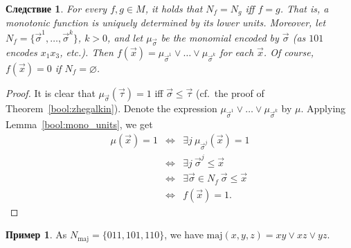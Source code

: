 \documentclass[12pt,notitlepage]{article}
\theoremstyle{plain}
\newtheorem{corr}[thm]{Следствие}
\theoremstyle{definition}
\newtheorem{exm}[thm]{Пример}
\theoremstyle{plain}
\newcommand{\void}{\varnothing}
\newcommand{\1}{\mathbf{1}}
\newcommand{\0}{\mathbf{0}}
\begin{document}
\begin{corr}\label{bool:monot_monom}
	For every $f, g \in M$, it holds that $N_f = N_g$ iff $f = g$. That is, a monotonic function is uniquely determined by its lower units. Moreover, let $N_f = \{ \vec \sigma^1, \ldots,  \vec \sigma^k \}$, $k > 0$, and let $\mu_{\vec \sigma}$ be the monomial encoded by $\vec \sigma$ (as $101$ encodes $x_1 x_3$, etc.). Then $f(\vec x) = \mu_{\vec \sigma^1} \vee \ldots \vee \mu_{\vec \sigma^k}$ for each $\vec x$. Of course, $f(\vec x) = 0$ if $N_f = \void$.
\end{corr}
\begin{proof}
	It is clear that $\mu_{\vec \sigma}(\vec \tau) = 1$ iff $\vec \sigma \leq \vec \tau$ (cf.~the proof of Theorem~\ref{bool:zhegalkin}). Denote the expression  $\mu_{\vec \sigma^1} \vee \ldots \vee \mu_{\vec \sigma^k}$ by $\mu$. Applying Lemma~\ref{bool:mono_units}, we get
	$$
	\begin{array}{rcl}
		\mu(\vec x) = 1 &\iff& \exists j\: \mu_{\vec\sigma^j}(\vec x) = 1\\
		&\iff& \exists j\: \vec\sigma^j \leq \vec x\\
		&\iff& \exists \vec \sigma \in N_f\ \vec\sigma \leq \vec x\\
		&\iff& f(\vec x) = 1.
	\end{array}
	$$
\end{proof}

\begin{exm}
	As $N_{\mathrm{maj}} = \{011, 101, 110\}$, we have $\mathrm{maj}(x,y,z) = xy \vee xz \vee yz$.
\end{exm}
\end{document}
